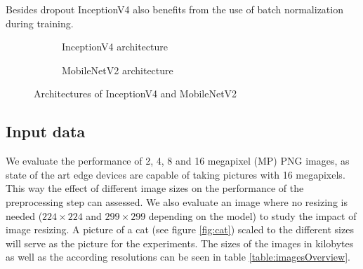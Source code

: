 Besides dropout InceptionV4 also benefits from the use of batch normalization during training.

\begin{figure}[!htb]
\centering
\begin{subfigure}[t]{0.47\textwidth}
   \resizebox{.99\linewidth}{!}{}
   \caption{InceptionV4 architecture \cite{InceptionV4}}
   \label{fig:inceptionv4Archi} 
\end{subfigure}%
\begin{subfigure}[t]{0.47\textwidth}
   \resizebox{.99\linewidth}{!}{}
   \caption{MobileNetV2 architecture \cite{DBLP:journals/corr/abs-1801-04381}}
   \label{fig:MobileNetArchi}
\end{subfigure}

\caption{Architectures of InceptionV4 and MobileNetV2}
\end{figure}

\subsection{Input data}
We evaluate the performance of 2, 4, 8 and 16  megapixel (MP) PNG images, as state of the art edge devices  are capable of taking pictures with 16 megapixels. This way the effect of different image sizes on the performance of the preprocessing step can assessed. We also evaluate an image where no resizing is needed ($224\times224$ and $299\times299$ depending on the model) to study the impact of image resizing. A picture of a cat (see figure \ref{fig:cat}) scaled to the different sizes will serve as the picture for the experiments.
The sizes of the images in kilobytes as well as the according resolutions can be seen in table \ref{table:imagesOverview}.

